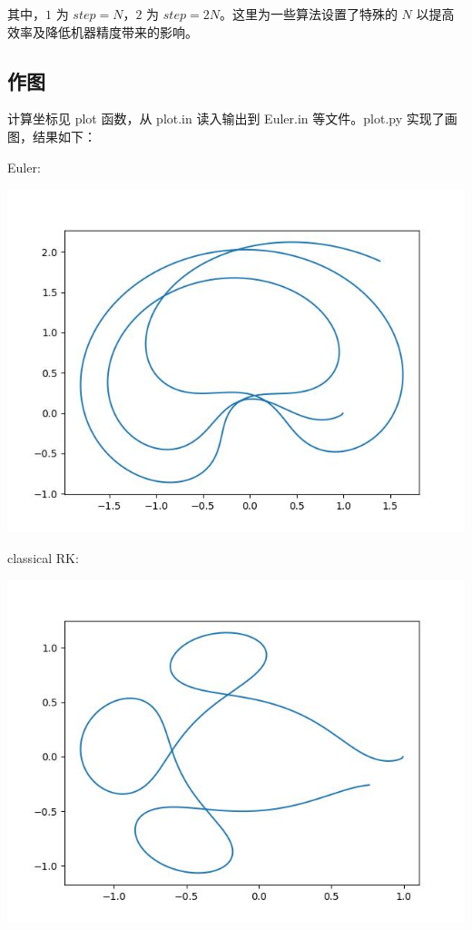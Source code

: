 \documentclass[12pt]{ctexart}
\begin{document}
其中，$1$ 为 $step=N$，$2$ 为 $step=2N$。这里为一些算法设置了特殊的 $N$ 以提高效率及降低机器精度带来的影响。

\subsection*{作图}

计算坐标见 plot 函数，从 plot.in 读入输出到 Euler.in 等文件。plot.py 实现了画图，结果如下：

Euler:

\includegraphics[scale=0.8]{Euler.jpg}

classical RK:

\includegraphics[scale=0.8]{classical RK.jpg}
\end{document}
